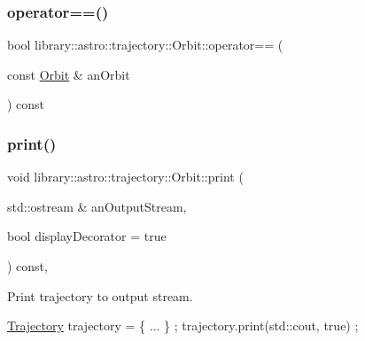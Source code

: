 \mbox{\label{classlibrary_1_1astro_1_1trajectory_1_1_orbit_a3af58a0fe7d899ba73ab5ac3af310425}} 
\subsubsection{\texorpdfstring{operator==()}{operator==()}}
{\footnotesize\ttfamily bool library\+::astro\+::trajectory\+::\+Orbit\+::operator== (\begin{DoxyParamCaption}\item[{const \hyperlink{classlibrary_1_1astro_1_1trajectory_1_1_orbit}{Orbit} \&}]{an\+Orbit }\end{DoxyParamCaption}) const}

\mbox{\label{classlibrary_1_1astro_1_1trajectory_1_1_orbit_ac3b8c212e5b66822ab7eb09785a6c228}} 
\subsubsection{\texorpdfstring{print()}{print()}}
{\footnotesize\ttfamily void library\+::astro\+::trajectory\+::\+Orbit\+::print (\begin{DoxyParamCaption}\item[{std\+::ostream \&}]{an\+Output\+Stream,  }\item[{bool}]{display\+Decorator = {\ttfamily true} }\end{DoxyParamCaption}) const\hspace{0.3cm}{\ttfamily [override]}, {\ttfamily [virtual]}}



Print trajectory to output stream. 


\begin{DoxyCode}
\hyperlink{classlibrary_1_1astro_1_1_trajectory_a8e5c7740915ca947e067c0f419ac1c65}{Trajectory} trajectory = \{ ... \} ;
trajectory.print(std::cout, \textcolor{keyword}{true}) ;
\end{DoxyCode}



